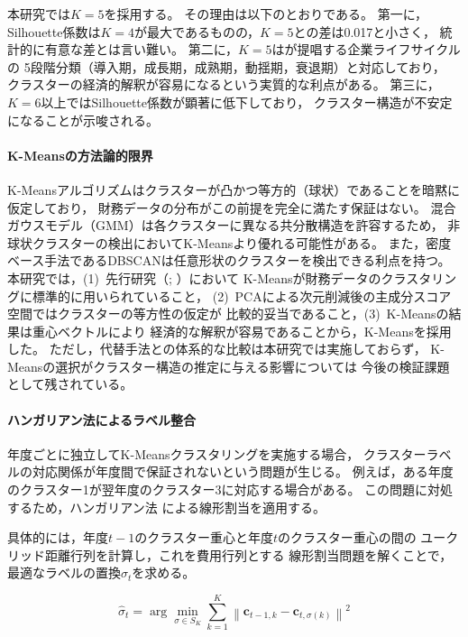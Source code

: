本研究では$K = 5$を採用する。
その理由は以下のとおりである。
第一に，Silhouette係数は$K = 4$が最大であるものの，$K = 5$との差は0.017と小さく，
統計的に有意な差とは言い難い。
第二に，$K = 5$はが提唱する企業ライフサイクルの
5段階分類（導入期，成長期，成熟期，動揺期，衰退期）と対応しており，
クラスターの経済的解釈が容易になるという実質的な利点がある。
第三に，$K = 6$以上ではSilhouette係数が顕著に低下しており，
クラスター構造が不安定になることが示唆される。

\paragraph{K-Meansの方法論的限界}

K-Meansアルゴリズムはクラスターが凸かつ等方的（球状）であることを暗黙に仮定しており，
財務データの分布がこの前提を完全に満たす保証はない。
混合ガウスモデル（GMM）は各クラスターに異なる共分散構造を許容するため，
非球状クラスターの検出においてK-Meansより優れる可能性がある。
また，密度ベース手法であるDBSCANは任意形状のクラスターを検出できる利点を持つ。
本研究では，(1)~先行研究（; ）において
K-Meansが財務データのクラスタリングに標準的に用いられていること，
(2)~PCAによる次元削減後の主成分スコア空間ではクラスターの等方性の仮定が
比較的妥当であること，(3)~K-Meansの結果は重心ベクトルにより
経済的な解釈が容易であることから，K-Meansを採用した。
ただし，代替手法との体系的な比較は本研究では実施しておらず，
K-Meansの選択がクラスター構造の推定に与える影響については
今後の検証課題として残されている。

\paragraph{ハンガリアン法によるラベル整合}

年度ごとに独立してK-Meansクラスタリングを実施する場合，
クラスターラベルの対応関係が年度間で保証されないという問題が生じる。
例えば，ある年度のクラスター1が翌年度のクラスター3に対応する場合がある。
この問題に対処するため，ハンガリアン法
\citep{Kuhn1955}による線形割当を適用する。

具体的には，年度$t-1$のクラスター重心と年度$t$のクラスター重心の間の
ユークリッド距離行列を計算し，これを費用行列とする
線形割当問題を解くことで，最適なラベルの置換$\hat{\sigma}_t$を求める。

\begin{equation}
  \hat{\sigma}_t = \arg\min_{\sigma \in S_K}
  \sum_{k=1}^{K} \left\| \mathbf{c}_{t-1, k} - \mathbf{c}_{t, \sigma(k)} \right\|^2
  \label{eq:hungarian}
\end{equation}

